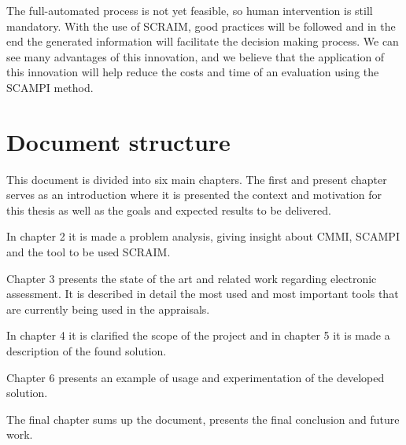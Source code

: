 The full-automated process is not yet feasible, so human intervention is still mandatory. With the use of SCRAIM, good practices will be followed and in the end the generated information will facilitate the decision making process. We can see many advantages of this innovation, and we believe that the application of this innovation will help reduce the costs and time of an evaluation using the SCAMPI method.

\section{Document structure} \label{sec:Structure}

This document is divided into six main chapters. The first and present chapter serves as an introduction where it is presented the context and motivation for this thesis as well as the goals and expected results to be delivered.

In chapter 2 it is made a problem analysis, giving insight about CMMI, SCAMPI and the tool to be used SCRAIM.

Chapter 3 presents the state of the art and related work regarding electronic assessment. It is described in detail the most used and most important tools that are currently being used in the appraisals.

In chapter 4 it is clarified the scope of the project and in chapter 5 it is made a description of the found solution.

Chapter 6 presents an example of usage and experimentation of the developed solution.

The final chapter sums up the document, presents the final conclusion and future work.